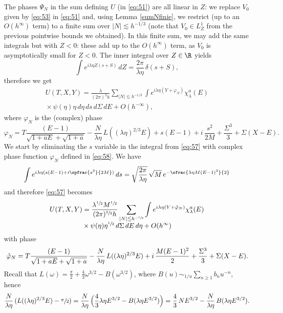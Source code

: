 The phases $\Psi_N$ in the sum defining $U$ (in \eqref{eq:51}) are all linear in ${Z}$: we replace $V_0$ given by \eqref{eq:53} in \eqref{eq:51} and, using Lemma \ref{sumNfinie}, we restrict (up to an $O(h^{\infty})$ term) to a finite sum over $|N|\lesssim h^{-1/3}$ (note that $V_{0}\in L^{1}_{Z}$ from the previous pointwise bounds we obtained). In this finite sum, we may add the same integrals but with $Z<0$: these add up to the $O(h^{\infty})$ term, as $V_{0}$ is asymptotically small for $Z<0$. The inner integral over ${Z}\in \R$ yields
\[
\int e^{i\lambda \eta {Z}(s+S)}\,dZ= \frac{2\pi}{\lambda \eta}\, \delta(s+S),
\]
therefore we get
\begin{multline}
\label{eq:57}
U(T,X,Y)
=\frac{\lambda}{(2\pi)^{2}h} \sum_{|N|\lesssim h^{-1/3}} \int e^{i\lambda \eta(Y+\varphi_{N})} \chi_{\lambda}^{a}(E)\\[-5pt]
{}\times\psi(\eta) \eta \,d\eta \,ds \,d\Sigma \,dE+O({h^{-\infty}}),
\end{multline}
where $\varphi_{N}$ is the (complex) phase
\begin{equation}
\label{eq:58}
\varphi_{N}= T \frac{(E-1)}{ \sqrt{1+aE}+\sqrt{1+a}} - \frac N {\lambda \eta}\, L((\lambda \eta)^{2/3} E)+s (E-1) + i\, \frac {s^{2}}{2M} +\frac{\Sigma^{3}} 3+ \Sigma (X-E).
\end{equation}
We start by eliminating the $s$ variable in the integral from \eqref{eq:57} with complex phase function $\varphi_N$ defined in \eqref{eq:58}. We have
\begin{equation*}
\label{eq:61}
\int e^{i\lambda \eta (s(E-1)+i\spfrac {s^{2}}{2M})}
\,ds= \sqrt{\frac{2\pi}{\lambda\eta}}\, \sqrt M\, e^{-\sfrac{\lambda\eta M(E-1)^{2}}{2}}
\end{equation*}
and therefore \eqref{eq:57} becomes
\begin{multline}
\label{eq:62}
U(T,X,Y)=\frac{\lambda^{\sfrac 12}M^{\sfrac 12}}{ (2\pi)^{\sfrac 32}h}\sum_{|N|\lesssim h^{-\sfrac 13}}\int e^{i\lambda \eta(Y+\tilde\varphi_{N})} \chi_{\lambda}^{a }(E)\\[-5pt]
{}\times\psi(\eta)\eta^{\sfrac 12} \,d\Sigma \,dE \,d\eta+O(h^{\infty})
\end{multline}
with phase
\begin{equation}
\label{eq:63}
\tilde\varphi_{N} = T \frac{(E-1)}{ \sqrt{1+aE}+\sqrt{1+a}} - \frac N {\lambda \eta}\, L((\lambda \eta)^{2/3} E)\\{}+ i\, \frac {M(E-1)^{2}}{2} +\frac{\Sigma^{3}} 3+ \Sigma (X-E).
\end{equation}
Recall that $L(\omega)=\frac\pi 2 + \frac 43 \omega^{3/2}-B(\omega^{3/2})$, where $B(u)\sim_{1/u}\sum_{n\geq 1} b_{n}u^{-n}$, hence
\[
\frac N {\lambda \eta}\, (L((\lambda \eta)^{2/3} E)-\sfrac \pi 2)=\frac N {\lambda \eta}\, \Bigl(\frac 43 \lambda\eta E^{3/2}-B(\lambda\eta E^{3/2})\Bigr)=\frac 43\, NE^{3/2}-\frac N {\lambda \eta}\,B(\lambda\eta E^{3/2}).
\]

